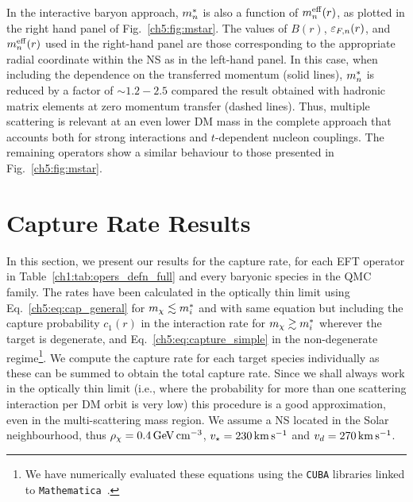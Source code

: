 In the interactive baryon approach, $m_n^*$ is also a function of $m_n^{\rm eff}(r)$, as plotted in the right hand panel of Fig.~\ref{ch5:fig:mstar}. 
The values of $B(r)$, $\varepsilon_{F,n}(r)$, and $m_n^{\rm eff}(r)$ used in the right-hand panel are those corresponding to the appropriate radial coordinate within the NS as in the left-hand panel. 
In this case, when including the dependence on the transferred momentum (solid lines), $m_n^*$ is reduced by a factor of $\sim 1.2 - 2.5$ compared the result obtained with hadronic matrix elements at zero momentum transfer (dashed lines). Thus, multiple scattering is relevant at an even lower DM mass in the complete approach that accounts both for strong interactions and $t$-dependent nucleon couplings. 
The remaining operators show a similar behaviour to those presented in Fig.~\ref{ch5:fig:mstar}.


\section{Capture Rate Results}
\label{ch5:sec:capture_results}

In this section, we present our results for the capture rate, 
for each EFT operator in Table~\ref{ch1:tab:opers_defn_full} and every baryonic species in the QMC family. The rates have been calculated in the optically thin limit using Eq.~\ref{ch5:eq:cap_general} for $m_\chi\lesssim m_i^*$ and with same equation but including the capture probability $c_1(r)$ in the interaction rate for $m_\chi\gtrsim m_i^*$ wherever the target is degenerate, and Eq.~\ref{ch5:eq:capture_simple} in the non-degenerate regime\footnote{We have numerically evaluated these equations using the \texttt{CUBA} libraries \cite{Hahn:2004fe_CUBALibrarymultidimensional,Hahn:2014fua_Concurrentcuba} linked to \texttt{Mathematica}~\cite{Mathematica}.}. We compute the capture rate for each target species individually as these can be summed to obtain the total capture rate. Since we shall always work in the optically thin limit (i.e., where the probability for more than one scattering interaction per DM orbit is very low) this procedure is a good approximation, even in the multi-scattering mass region.
We assume a NS located in the Solar neighbourhood, thus $\rho_\chi=0.4{\rm \,GeV}{\rm \,cm}^{-3}$, $v_\star=230{\rm \,km}{\rm \,s}^{-1}$ and $v_d=270{\rm \,km}{\rm \,s}^{-1}$.  



